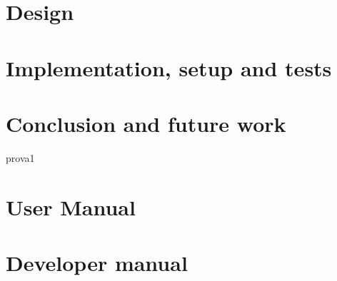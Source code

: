 \documentclass[pdfa%
,twoside%
,12pt%
]{toptesi}
\begin{document}
\chapter{Design}
\label{chap:3}


\chapter{Implementation, setup and tests}
\label{chap:4}

\chapter{Conclusion and future work}
\label{chap:5}


\appendix
prova1
\chapter{User Manual}

\chapter{Developer manual}


%



\end{document}
